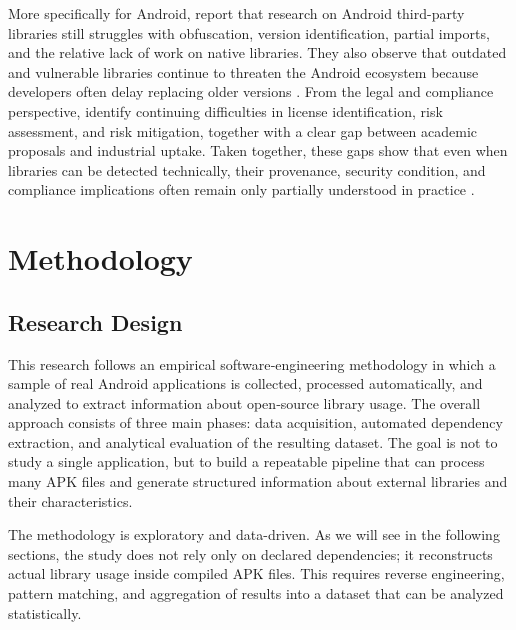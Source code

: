 \documentclass[12pt,a4paper]{report}
\begin{document}
More specifically for Android, \textcite{zhanResearchThirdPartyLibraries2022} report that research on Android third-party libraries still struggles with obfuscation, version identification, partial imports, and the relative lack of work on native libraries. They also observe that outdated and vulnerable libraries continue to threaten the Android ecosystem because developers often delay replacing older versions \parencite{zhanResearchThirdPartyLibraries2022}. From the legal and compliance perspective, \textcite{liOpenSourceHidden2025} identify continuing difficulties in license identification, risk assessment, and risk mitigation, together with a clear gap between academic proposals and industrial uptake. Taken together, these gaps show that even when libraries can be detected technically, their provenance, security condition, and compliance implications often remain only partially understood in practice \parencite{zhanResearchThirdPartyLibraries2022,williamsResearchDirectionsSoftware2025,liOpenSourceHidden2025}.

\chapter{Methodology}

\section{Research Design}
This research follows an empirical software‑engineering methodology in which a sample of real Android applications is collected, processed automatically, and analyzed to extract information about open‑source library usage. The overall approach consists of three main phases: data acquisition, automated dependency extraction, and analytical evaluation of the resulting dataset. The goal is not to study a single application, but to build a repeatable pipeline that can process many APK files and generate structured information about external libraries and their characteristics.

The methodology is exploratory and data-driven. As we will see in the following sections, the study does not rely only on declared dependencies; it reconstructs actual library usage inside compiled APK files. This requires reverse engineering, pattern matching, and aggregation of results into a dataset that can be analyzed statistically.
\end{document}
